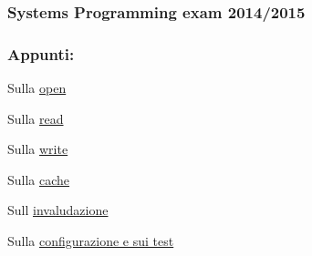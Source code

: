 \subsubsection*{Systems Programming exam 2014/2015}

\subsubsection*{Appunti\+:}


\begin{DoxyItemize}
\item Sulla \hyperlink{md_OPE}{open}
\item Sulla \hyperlink{md_READ}{read}
\item Sulla \hyperlink{md_WRITE}{write}
\item Sulla \hyperlink{md_Cache}{cache}
\item Sull\textquotesingle{} \hyperlink{md_Invalidazione}{invaludazione}
\item Sulla \hyperlink{md_Test}{configurazione e sui test} 
\end{DoxyItemize}